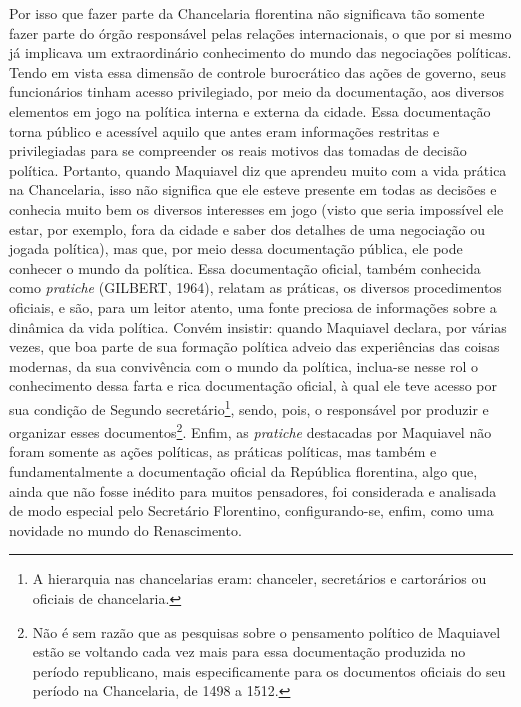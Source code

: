 Por isso que fazer parte da Chancelaria florentina não significava tão
somente fazer parte do órgão responsável pelas relações internacionais,
o que por si mesmo já implicava um extraordinário conhecimento do mundo
das negociações políticas. Tendo em vista essa dimensão de controle
burocrático das ações de governo, seus funcionários tinham acesso
privilegiado, por meio da documentação, aos diversos elementos em jogo
na política interna e externa da cidade. Essa documentação torna público
e acessível aquilo que antes eram informações restritas e privilegiadas
para se compreender os reais motivos das tomadas de decisão política.
Portanto, quando Maquiavel diz que aprendeu muito com a vida prática na
Chancelaria, isso não significa que ele esteve presente em todas as
decisões e conhecia muito bem os diversos interesses em jogo (visto que
seria impossível ele estar, por exemplo, fora da cidade e saber dos
detalhes de uma negociação ou jogada política), mas que, por meio dessa
documentação pública, ele pode conhecer o mundo da política. Essa
documentação oficial, também conhecida como \emph{pratiche} (GILBERT,
1964), relatam as práticas, os diversos procedimentos oficiais, e são,
para um leitor atento, uma fonte preciosa de informações sobre a
dinâmica da vida política. Convém insistir: quando Maquiavel declara,
por várias vezes, que boa parte de sua formação política adveio das
experiências das coisas modernas, da sua convivência com o mundo da
política, inclua-se nesse rol o conhecimento dessa farta e rica
documentação oficial, à qual ele teve acesso por sua condição de Segundo
secretário\footnote{A hierarquia nas chancelarias eram: chanceler,
  secretários e cartorários ou oficiais de chancelaria.}, sendo, pois, o
responsável por produzir e organizar esses documentos\footnote{Não é sem
  razão que as pesquisas sobre o pensamento político de Maquiavel estão
  se voltando cada vez mais para essa documentação produzida no período
  republicano, mais especificamente para os documentos oficiais do seu
  período na Chancelaria, de 1498 a 1512.}. Enfim, as \emph{pratiche}
destacadas por Maquiavel não foram somente as ações políticas, as
práticas políticas, mas também e fundamentalmente a documentação oficial
da República florentina, algo que, ainda que não fosse inédito para
muitos pensadores, foi considerada e analisada de modo especial pelo
Secretário Florentino, configurando-se, enfim, como uma novidade no
mundo do Renascimento.

